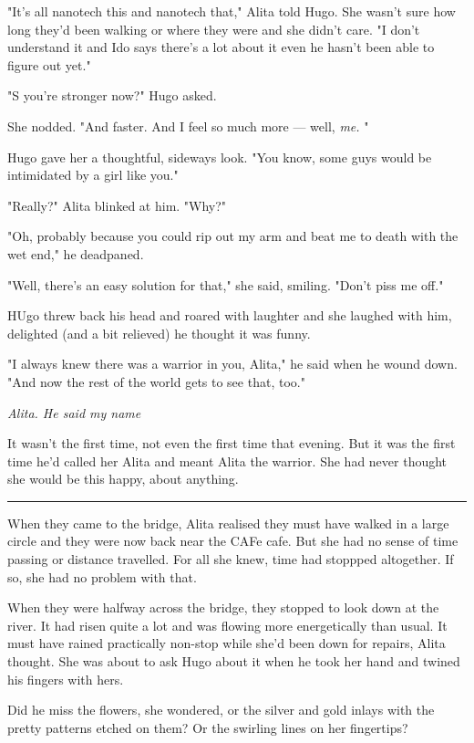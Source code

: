 \documentclass[11pt]{article}
\begin{document}
"It's all nanotech this and nanotech that," Alita told Hugo. She wasn't sure how long they'd been walking or where they were and she didn't care. "I don't understand it and Ido says there's a lot about it even he hasn't been able to figure out yet."

"S you're stronger now?" Hugo asked.

She nodded. "And faster. And I feel so much more --- well, \emph{me.} "

Hugo gave her a thoughtful, sideways look. "You know, some guys would be intimidated by a girl like you."

"Really?" Alita blinked at him. "Why?"

"Oh, probably because you could rip out my arm and beat me to death with the wet end," he deadpaned.

"Well, there's an easy solution for that," she said, smiling. "Don't piss me off."

HUgo threw back his head and roared with laughter and she laughed with him, delighted (and a bit relieved) he thought it was funny.

"I always knew there was a warrior in you, Alita," he said when he wound down. "And now the rest of the world gets to see that, too."


\emph{Alita. He said my name}

It wasn't the first time, not even the first time that evening. But it was the first time he'd called her Alita and meant Alita the warrior. She had never thought she would be this happy, about anything.




\rule{\linewidth}{0.5pt}




When they came to the bridge, Alita realised they must have walked in a large circle and they were now back near the CAFe cafe. But she had no sense of time passing or distance travelled. For all she knew, time had stoppped altogether. If so, she had no problem with that.

When they were halfway across the bridge, they stopped to look down at the river. It had risen quite a lot and was flowing more energetically than usual. It must have rained practically non-stop while she'd been down for repairs, Alita thought. She was about to ask Hugo about it when he took her hand and twined his fingers with hers.

Did he miss the flowers, she wondered, or the silver and gold inlays with the pretty patterns etched on them? Or the swirling lines on her fingertips?
\end{document}
